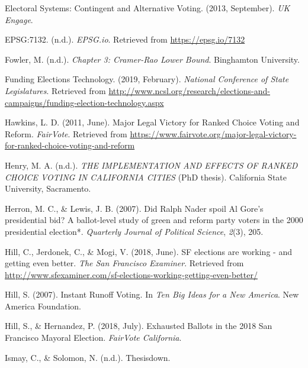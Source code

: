 \documentclass[12pt,twoside]{reedthesis}
\begin{document}
\leavevmode\hypertarget{ref-noauthor_electoral_2013}{}%
Electoral Systems: Contingent and Alternative Voting. (2013, September). \emph{UK Engage}.

\leavevmode\hypertarget{ref-noauthor_epsg7132_nodate}{}%
EPSG:7132. (n.d.). \emph{EPSG.io}. Retrieved from \url{https://epsg.io/7132}

\leavevmode\hypertarget{ref-fowler_chapter_2018}{}%
Fowler, M. (n.d.). \emph{Chapter 3: Cramer-Rao Lower Bound}. Binghamton University.

\leavevmode\hypertarget{ref-noauthor_funding_2019}{}%
Funding Elections Technology. (2019, February). \emph{National Conference of State Legislatures}. Retrieved from \url{http://www.ncsl.org/research/elections-and-campaigns/funding-election-technology.aspx}

\leavevmode\hypertarget{ref-hawkins_major_2011}{}%
Hawkins, L. D. (2011, June). Major Legal Victory for Ranked Choice Voting and Reform. \emph{FairVote}. Retrieved from \url{https://www.fairvote.org/major-legal-victory-for-ranked-choice-voting-and-reform}

\leavevmode\hypertarget{ref-henry_implementation_2016}{}%
Henry, M. A. (n.d.). \emph{THE IMPLEMENTATION AND EFFECTS OF RANKED CHOICE VOTING IN CALIFORNIA CITIES} (PhD thesis). California State University, Sacramento.

\leavevmode\hypertarget{ref-herron_did_2007}{}%
Herron, M. C., \& Lewis, J. B. (2007). Did Ralph Nader spoil Al Gore's presidential bid? A ballot-level study of green and reform party voters in the 2000 presidential election*. \emph{Quarterly Journal of Political Science}, \emph{2}(3), 205.

\leavevmode\hypertarget{ref-hill_sf_2018}{}%
Hill, C., Jerdonek, C., \& Mogi, V. (2018, June). SF elections are working - and getting even better. \emph{The San Francisco Examiner}. Retrieved from \url{http://www.sfexaminer.com/sf-elections-working-getting-even-better/}

\leavevmode\hypertarget{ref-hill_instant_2007}{}%
Hill, S. (2007). Instant Runoff Voting. In \emph{Ten Big Ideas for a New America}. New America Foundation.

\leavevmode\hypertarget{ref-hill_exhausted_2018}{}%
Hill, S., \& Hernandez, P. (2018, July). Exhausted Ballots in the 2018 San Francisco Mayoral Election. \emph{FairVote California}.

\leavevmode\hypertarget{ref-ismay_thesisdown_nodate}{}%
Ismay, C., \& Solomon, N. (n.d.). Thesisdown.
\end{document}
